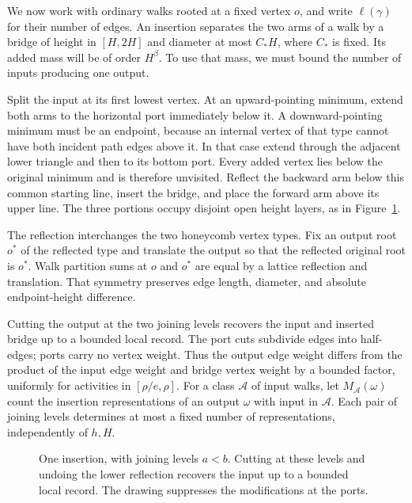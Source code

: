 We now work with ordinary walks rooted at a fixed vertex $o$, and write
$\ell(\gamma)$ for their number of edges. An insertion separates the two
arms of a walk by a bridge of height in $[H,2H]$ and diameter at most
$C_*H$, where $C_*$ is fixed. Its added mass will be of order $H^\beta$.
To use that mass, we must bound the number of inputs producing one output.

Split the input at its first lowest vertex. At an upward-pointing minimum,
extend both arms to the horizontal port immediately below it. A
downward-pointing minimum must be an endpoint, because an internal vertex
of that type cannot have both incident path edges above it. In that case
extend through the adjacent lower triangle and then to its bottom port.
Every added vertex lies below the original minimum and is therefore
unvisited. Reflect the backward arm below this common starting line,
insert the bridge, and place the forward arm above its upper line. The
three portions occupy disjoint open height layers, as in
Figure~\ref{R:alt:g:insertion-figure}.

The reflection interchanges the two honeycomb vertex types. Fix an output
root $o^*$ of the reflected type and translate the output so that the
reflected original root is $o^*$. Walk partition sums at $o$ and $o^*$ are
equal by a lattice reflection and translation. That symmetry preserves
edge length, diameter, and absolute endpoint-height difference.

Cutting the output at the two joining levels recovers the input and
inserted bridge up to a bounded local record. The port cuts subdivide
edges into half-edges; ports carry no vertex weight. Thus the output
edge weight differs from the product of the input edge weight and bridge
vertex weight by a bounded factor, uniformly for activities in
$[\rho/e,\rho]$. For a class $\mathcal A$ of input walks, let
$M_{\mathcal A}(\omega)$ count the insertion representations of an output
$\omega$ with input in $\mathcal A$. Each pair of joining levels determines
at most a fixed number of representations, independently of $h,H$.

\begin{figure}[ht]
\centering
{}
\caption{One insertion, with joining levels $a<b$. Cutting at these
levels and undoing the lower reflection recovers the input up to a
bounded local record. The drawing suppresses the modifications at the
ports.}
\label{R:alt:g:insertion-figure}
\end{figure}

